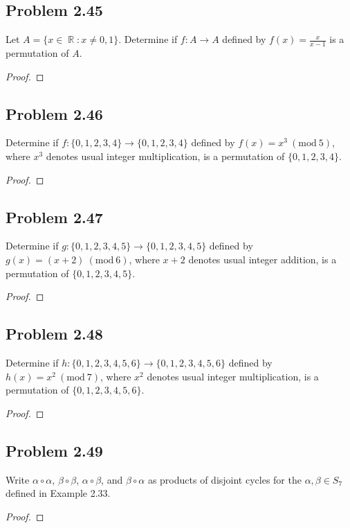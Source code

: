 \documentclass{amsbook}
\renewcommand{\mod}[1]{\ (\mathrm{mod}\ #1)}
\DeclareMathOperator{\R}{\mathbb{R}}
\begin{document}
			\subsection*{Problem 2.45}
			\label{sub:problem_2_45}
			Let $A = \{ x \in \R : x \neq 0,1 \}$. 
			Determine if $f:A \to A$ defined by $f(x) = \frac{x}{x-1}$ is a permutation of $A$. 
			\begin{proof}
			\end{proof}

			\subsection*{Problem 2.46}
			\label{sub:problem_2_46}
			Determine if $f: \{ 0,1,2,3,4 \} \to \{ 0,1,2,3,4 \}$ defined by $f(x) = x^{3} \mod{5}$, where $x^{3}$ denotes usual integer multiplication, is a permutation of $\{ 0,1,2,3,4 \}$.
			\begin{proof}
			\end{proof}

			\subsection*{Problem 2.47}
			\label{sub:problem_2_47}
			Determine if $g: \{ 0,1,2,3,4,5 \} \to \{ 0,1,2,3,4,5 \}$ defined by $g(x) = (x+2) \mod{6}$, where $x + 2$ denotes usual integer addition, is a permutation of $\{ 0,1,2,3,4,5 \}$.
			\begin{proof}
			\end{proof}

			\subsection*{Problem 2.48}
			\label{sub:problem_2_48}
			Determine if $h: \{ 0,1,2,3,4,5,6 \} \to \{ 0,1,2,3,4,5,6 \}$ defined by $h(x) = x^{2} \mod{7}$, where $x^{2}$ denotes usual integer multiplication, is a permutation of $\{ 0,1,2,3,4,5,6 \}$.
			\begin{proof}
			\end{proof}

			\subsection*{Problem 2.49}
			\label{sub:problem_2_49}
			Write $\alpha \circ \alpha$, $\beta \circ \beta$, $\alpha \circ \beta$, and $\beta \circ \alpha$ as products of disjoint cycles for the $\alpha,\beta \in S_{7}$ defined in Example 2.33.
			\begin{proof}
			\end{proof}
\end{document}
